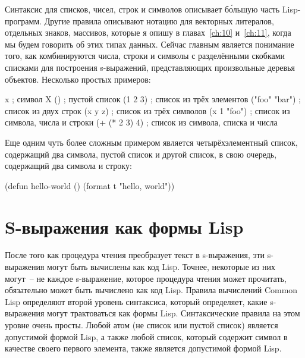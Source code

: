 Синтаксис для списков, чисел, строк и символов описывает б\'{о}льшую часть Lisp-программ.
Другие правила описывают нотацию для векторных литералов, отдельных знаков, массивов,
которые я опишу в главах~\ref{ch:10} и~\ref{ch:11}, когда мы будем говорить об этих типах
данных. Сейчас главным является понимание того, как комбинируются числа, строки и символы
с разделёнными скобками списками для построения s-выражений, представляющих произвольные
деревья объектов. Несколько простых примеров:

\begin{myverb}
x             ; символ X
()            ; пустой список
(1 2 3)       ; список из трёх элементов
("foo" "bar") ; список из двух строк
(x y z)       ; список из трёх символов
(x 1 "foo")   ; список из символа, числа и строки
(+ (* 2 3) 4) ; список из символа, списка и числа
\end{myverb}

Еще одним чуть более сложным примером является четырёхэлементный список, содержащий два
символа, пустой список и другой список, в свою очередь, содержащий два символа и строку:

\begin{myverb}
(defun hello-world ()
  (format t "hello, world"))
\end{myverb}

\section{S-выражения как формы Lisp}

После того как процедура чтения преобразует текст в s-выражения, эти s-выражения
могут быть вычислены как код Lisp. Точнее, некоторые из них могут~-- не каждое s-выражение,
которое процедура чтения может прочитать, обязательно может быть вычислено как код
Lisp. Правила вычислений Common Lisp определяют второй уровень синтаксиса, который
определяет, какие s-выражения могут трактоваться как формы Lisp. Синтаксические правила на этом уровне очень просты. Любой атом (не список или
пустой список) является допустимой формой Lisp, а также любой список, который содержит
символ в качестве своего первого элемента, также является до\-пус\-ти\-мой формой
Lisp.

